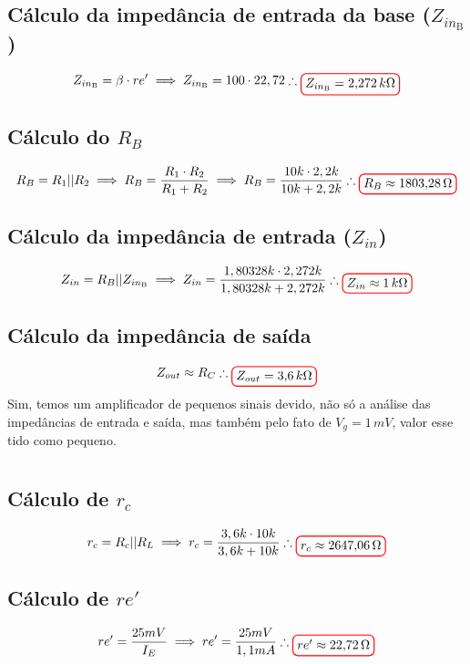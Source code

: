\documentclass[12pt,openany,oneside,a4paper]{abntex2}
\begin{document}
\subsection{Cálculo da impedância de entrada da base ($Z_{in_{\text{B}}}$)}
\[
Z_{in_{\text{B}}} = \beta \cdot re' \implies Z_{in_{\text{B}}} = 100 \cdot 22,72 \therefore \tikz[baseline]{\node[draw=red, thick, rounded corners] {$Z_{in_{\text{B}}} = 2{,}272\,k\Omega$};}
\]

\subsection{Cálculo do $R_{B}$}
\[
R_{B} = R_{1} || R_{2} \implies R_{B} = \frac{R_{1} \cdot R_{2}}{R_{1} + R_{2}} \implies R_{B} = \frac{10k \cdot 2,2k}{10k + 2,2k} \therefore \tikz[baseline]{\node[draw=red, thick, rounded corners] {$R_{B} \approx 1803{,}28\,\Omega$};}
\]

\subsection{Cálculo da impedância de entrada ($Z_{in}$)}
\[
Z_{in} = R_{B} || Z_{in_{\text{B}}} \implies Z_{in} = \frac{1,80328k \cdot 2,272k}{1,80328k + 2,272k} \therefore \tikz[baseline]{\node[draw=red, thick, rounded corners] {$Z_{in} \approx 1\,k\Omega$};}
\]

\subsection{Cálculo da impedância de saída}
\[
Z_{out} \approx R_{C} \therefore \tikz[baseline]{\node[draw=red, thick, rounded corners] {$Z_{out} = 3{,}6\,k\Omega$};}
\]Sim, temos um amplificador de pequenos sinais devido, não só a análise das impedâncias de entrada e saída, mas também pelo fato de $V_{g} = 1\,mV$, valor esse tido como pequeno.

\section{}

\subsection{Cálculo de $r_{c}$}
\[
r_{c} = R_{c} || R_{L} \implies r_{c} = \frac{3,6k \cdot 10k}{3,6k + 10k} \therefore \tikz[baseline]{\node[draw=red, thick, rounded corners] {$r_{c} \approx 2647{,}06\,\Omega$};}
\]

\subsection{Cálculo de $re'$}
\[
re' = \frac{25mV}{I_{E}} \implies re' = \frac{25mV}{1,1mA} \therefore \tikz[baseline]{\node[draw=red, thick, rounded corners] {$re' \approx 22{,}72\,\Omega$};}
\]
\end{document}
